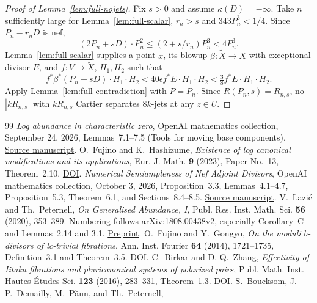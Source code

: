 \documentclass[12pt,a4paper,psamsfonts]{amsart}
\theoremstyle{definition}
\theoremstyle{plain}
\begin{document}
\begin{proof}[Proof of Lemma~\ref{lem:full-nojets}]
Fix $s>0$ and assume $\kappa(D)=-\infty$. Take $n$ sufficiently large
for Lemma~\ref{lem:full-scalar}, $r_n>s$ and $343P_n^3<1/4$.
Since $P_n-r_nD$ is nef,
\[
 (2P_n+sD)\cdot P_n^2\le(2+s/r_n)P_n^3<4P_n^3.
\]
Lemma~\ref{lem:full-scalar} supplies a point $x$, its blowup
$\beta:\widetilde X\to X$ with exceptional divisor $E$, and
$f:V\to\widetilde X$, $H_1,H_2$ such that
\[
 f^*\beta^*(P_n+sD)\cdot H_1\cdot H_2
 <40\epsilon f^*E\cdot H_1\cdot H_2
 <\tfrac38 f^*E\cdot H_1\cdot H_2.
\]
Apply Lemma~\ref{lem:full-contradiction} with $P=P_n$.
Since $R(P_n,s)=R_{n,s}$, no $|kR_{n,s}|$ with $kR_{n,s}$ Cartier
separates $8k$-jets at any $z\in U$.
\end{proof}

\begin{thebibliography}{99}
\emph{Log abundance in characteristic zero},
OpenAI mathematics collection, September 24, 2026,
Lemmas~7.1--7.5 (Tools for moving base components).
\href{https://github.com/openai/math/blob/main/preprints/Log-abundance-in-characteristic-zero-September-24-2026/paper.pdf}{Source manuscript}.
O.~Fujino and K.~Hashizume,
\emph{Existence of log canonical modifications and its applications},
Eur. J. Math. \textbf{9} (2023), Paper No.~13, Theorem~2.10.
\href{https://doi.org/10.1007/s40879-023-00598-0}{DOI}.
\emph{Numerical Semiampleness of Nef Adjoint Divisors},
OpenAI mathematics collection, October 3, 2026,
Proposition~3.3, Lemmas~4.1--4.7, Proposition~5.3,
Theorem~6.1, and Sections~8.4--8.5.
\href{https://github.com/openai/math/blob/main/preprints/Numerical-Semiampleness-of-Nef-Adjoint-Divisors-October-3-2026/paper.pdf}{Source manuscript}.
V.~Lazi\'c and Th.~Peternell,
\emph{On Generalised Abundance, I},
Publ. Res. Inst. Math. Sci. \textbf{56} (2020), 353--389.
Numbering follows arXiv:1808.00438v2, especially Corollary~C
and Lemmas~2.14 and 3.1.
\href{https://arxiv.org/pdf/1808.00438}{Preprint}.
O.~Fujino and Y.~Gongyo,
\emph{On the moduli $b$-divisors of lc-trivial fibrations},
Ann. Inst. Fourier \textbf{64} (2014), 1721--1735,
Definition~3.1 and Theorem~3.5.
\href{https://doi.org/10.5802/aif.2894}{DOI}.
C.~Birkar and D.-Q.~Zhang,
\emph{Effectivity of Iitaka fibrations and pluricanonical
systems of polarized pairs},
Publ. Math. Inst. Hautes \'Etudes Sci. \textbf{123} (2016),
283--331, Theorem~1.3.
\href{https://doi.org/10.1007/s10240-016-0080-x}{DOI}.
S.~Boucksom, J.-P.~Demailly, M.~P\u{a}un, and Th.~Peternell,

\end{thebibliography}
\end{document}
